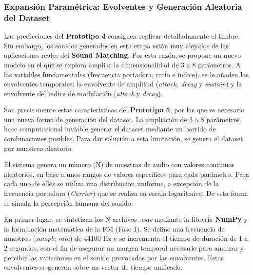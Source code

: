 \documentclass[12pt, a4paper]{article}
\begin{document}
\subsubsection{Expansión Paramétrica: Evolventes y Generación Aleatoria del Dataset}
Las predicciones del \textbf{Prototipo 4} consiguen replicar detalladamente el timbre. Sin embargo,
los sonidos generados en esta etapa están muy alejados de las aplicaciones reales del \textbf{Sound Matching}. 
Por esta razón, se propone un nuevo modelo en el que se explora ampliar
la dimensionalidad de 3 a 8 parámetros. A las variables
fundamentales (frecuencia portadora, ratio e índice), se le añaden las envolventes temporales: 
la envolvente de amplitud (\textit{attack, decay} y \textit{sustain}) y la envolvente del índice de 
modulación (\textit{attack} y \textit{decay}).

Son precisamente estas características del \textbf{Prototipo 5}, por las que es necesario una nueva 
forma de generación del dataset. La ampliación de 3 a 8 parámetros hace computacional inviable generar
el dataset mediante un barrido de combinaciones posibles. Para dar solución a esta limitación, se genera el dataset
por muestreo aleatorio. 

El sistema genera un número (N) de muestras de audio con valores continuos aleatorios,
en base a unos rangos de valores específicos para cada parámetro. Para cada uno de ellos 
se utiliza una distribución uniforme, a excepción de la frecuencia portadora (\textit{Carrier}) que 
se realiza en escala logarítmica. De esta forma se simula la percepción humana del sonido. 

En primer lugar, se sintetizan los N archivos \textit{.wav} mediante la librería \textbf{NumPy} y la formulación matemática de la FM (Fase 1). 
Se define una frecuencia de muestreo (\textit{sample rate}) de 44100 Hz
y se incrementa el tiempo de duración de 1 a 2 segundos, con el fin de asegurar un margen temporal
necesario para analizar y percibir las variaciones en el sonido provocadas por las envolventes. 
Estas envolventes se generan sobre un vector de tiempo unificado. 
\end{document}
